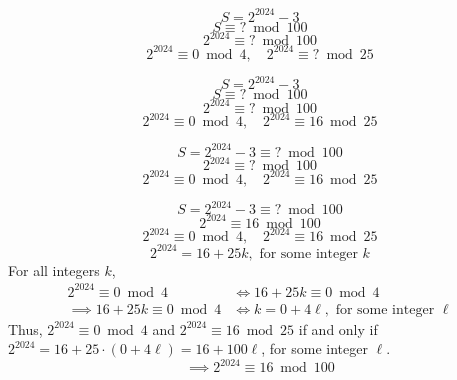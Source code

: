 \documentclass{beamer} %
\begin{document}
\begin{frame}{}
\[
S = 2^{2024} - 3
\]
\[
S \equiv \text{?} \bmod 100
\]
\[
2^{2024} \equiv \text{?} \bmod 100
\]
\[
2^{2024} \equiv 0 \bmod 4, \quad 2^{2024} \equiv \text{?} \bmod 25
\]
\end{frame}

\begin{frame}{}
\[
S = 2^{2024} - 3
\]
\[
S \equiv \text{?} \bmod 100
\]
\[
2^{2024} \equiv \text{?} \bmod 100
\]
\[
2^{2024} \equiv 0 \bmod 4, \quad 2^{2024} \equiv 16 \bmod 25
\]
\end{frame}

\begin{frame}{}
\[
S = 2^{2024} - 3 \equiv \text{?} \bmod 100
\]
\[
2^{2024} \equiv \text{?} \bmod 100
\]
\[
2^{2024} \equiv 0 \bmod 4, \quad 2^{2024} \equiv 16 \bmod 25
\]
\end{frame}

\begin{frame}{}
\[
S = 2^{2024} - 3 \equiv \text{?} \bmod 100
\]
\[
2^{2024} \equiv 16 \bmod 100
\]
\[
2^{2024} \equiv 0 \bmod 4, \quad 2^{2024} \equiv 16 \bmod 25
\]
\[
2^{2024} = 16 + 25k, \text{ for some integer } k
\]
For all integers $k$,
\begin{align*}
2^{2024} \equiv 0 \bmod 4 &\iff 16 + 25k \equiv 0 \bmod 4\\
\implies 16 + 25k \equiv 0 \bmod 4 &\iff k = 0 + 4\ell, \text{ for some integer } \ell
\end{align*}
Thus, $2^{2024} \equiv 0 \bmod 4$ and $2^{2024} \equiv 16 \bmod 25$ if and only if $2^{2024} = 16 + 25 \cdot (0 + 4 \ell) = 16 + 100\ell$, for some integer $\ell$.
\[
\implies 2^{2024} \equiv 16 \bmod 100
\]
\end{frame}
\end{document}
